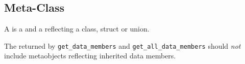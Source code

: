\subsection{Meta-Class}
\label{concept-Meta-Class}

A  is a  and a 
reflecting a class, struct or union.





The  returned by \texttt{get\_data\_members} and
\texttt{get\_all\_data\_members} should \emph{not} include metaobjects reflecting
inherited data members.
